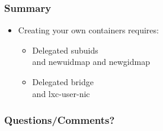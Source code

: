\documentclass{beamer}
\begin{document}
\begin{frame}
\frametitle{Summary}
	\begin{itemize}
	\item Creating your own containers requires:
		\begin{itemize}
		\item Delegated subuids \\
		{\tiny and newuidmap and newgidmap}
		\item Delegated bridge \\
		{\tiny and lxc-user-nic}
		\end{itemize}
	\end{itemize}
\end{frame}


\begin{frame}
\frametitle{Questions/Comments?}
\end{frame}

\end{document}
